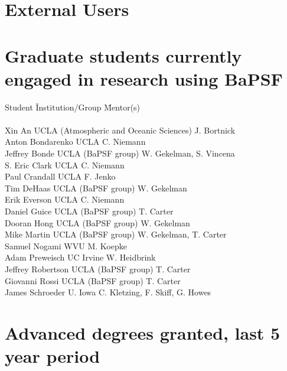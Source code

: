 \documentclass[11pt]{article}
\date{}
\title{}
\begin{document}
\section{External Users}



\section{Graduate students currently engaged in research using BaPSF}

\begin{tabbing}
Student \hspace{0.8in} \=  Institution/Group \hspace{2.1in} \= Mentor(s) \\
\\
Xin An \> UCLA (Atmospheric and Oceanic Sciences) \> J. Bortnick\\
Anton Bondarenko \> UCLA \> C. Niemann\\
Jeffrey Bonde \> UCLA (BaPSF group) \> W. Gekelman, S. Vincena \\
S. Eric Clark \> UCLA \> C. Niemann\\
Paul Crandall \> UCLA \> F. Jenko \\
Tim DeHaas \> UCLA (BaPSF group) \> W. Gekelman \\
Erik Everson \> UCLA \> C. Niemann\\
Daniel Guice \> UCLA (BaPSF group) \> T. Carter \\
Dooran Hong \> UCLA (BaPSF group) \> W. Gekelman\\
Mike Martin \> UCLA (BaPSF group) \> W. Gekelman, T. Carter \\
Samuel Nogami \> WVU \> M. Koepke \\
Adam Preweisch \> UC Irvine \> W. Heidbrink\\
Jeffrey Robertson \> UCLA (BaPSF group) \> T. Carter \\
Giovanni Rossi \> UCLA (BaPSF group) \> T. Carter \\
James Schroeder \> U. Iowa \> C. Kletzing, F. Skiff, G. Howes \\
\end{tabbing}


\section{Advanced degrees granted, last 5 year period}
\end{document}
